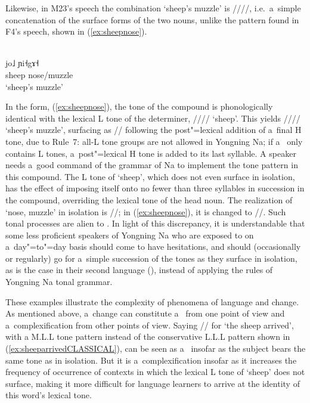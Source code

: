 Likewise, in M23's speech the combination ‘sheep’s muzzle’ is ////, i.e.\ a~simple concatenation of the surface forms of the two nouns,
unlike the  pattern found in F4’s speech, shown in (\ref{ex:sheepnose}).

\begin{exe}
	\ex
	\label{ex:sheepnose}
	\\
	\gll jo˩	ɲi˧gɤ˧\\
	sheep		nose/muzzle\\
	\glt ‘sheep's muzzle’
\end{exe}

In the  form, (\ref{ex:sheepnose}), the tone of the compound is phonologically identical with the lexical L tone of the determiner, //// ‘sheep’. This yields //// ‘sheep’s muzzle’, surfacing
as // following the post"=lexical addition of a~final H tone, due to Rule~7: all-L
tone groups are not allowed in Yongning Na; if a~ only contains L tones, a~post"=lexical H tone is added to its last
syllable. A speaker needs a~good command of the grammar of Na to implement the  tone pattern in
this compound. The L tone of ‘sheep’, which does not
even surface in isolation, has the effect of imposing itself onto no fewer than three syllables in
succession in the compound, overriding the lexical tone of the head noun. The realization of ‘nose, muzzle’ in isolation is /{\kern2pt}/; in (\ref{ex:sheepnose}), it is changed to /{\kern2pt}/. Such tonal processes are alien to . In light of this discrepancy, it is understandable that some less proficient
speakers of Yongning Na who are exposed to  on a~day"=to"=day basis should come to have hesitations, and should (occasionally or regularly) go for a~simple succession of the tones as they surface in
isolation, as is the case in their second language (), instead of applying the rules of Yongning Na tonal grammar.

These examples illustrate the complexity of phenomena of language  and change. As mentioned above, a~change can
constitute a~ from one point of view and a~complexification from other points of
view. Saying // for ‘the sheep arrived’, with a M.L.L tone pattern instead of the conservative L.L.L pattern shown in (\ref{ex:sheeparrivedCLASSICAL}), can be seen as a~
insofar as the subject bears the same tone as in isolation. But it is a~complexification insofar as it
increases the frequency of occurrence of contexts in which the lexical L tone of ‘sheep’ does not
surface, making it more difficult for language learners to arrive at the identity of this word’s
lexical tone.



